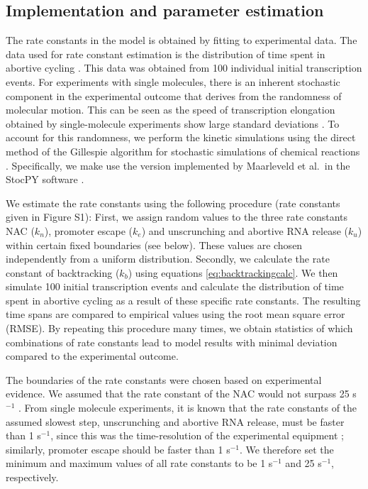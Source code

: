 \subsection{Implementation and parameter estimation}
The rate constants in the model is obtained by fitting to experimental data.
The data used for rate constant estimation is the distribution of time spent
in abortive cycling \cite{revyakin_abortive_2006}. This data was obtained from
100 individual initial transcription events. For experiments with single
molecules, there is an inherent stochastic component in the experimental
outcome that derives from the randomness of molecular motion. This can be seen
as the speed of transcription elongation obtained by single-molecule
experiments show large standard deviations \cite{adelman_single_2002,
tolic-norrelykke_diversity_2004}. To account for this randomness, we perform
the kinetic simulations using the direct method of the Gillespie algorithm for
stochastic simulations of chemical reactions \cite{gillespie_exact_1977}.
Specifically, we make use the version implemented by Maarleveld et al.\ in the
StocPY software \cite{maarleveld_stochpy:_2013}.

We estimate the rate constants using the following procedure (rate constants
given in Figure S1): First, we assign random values to the three rate
constants NAC ($k_n$), promoter escape ($k_e$) and unscrunching and abortive
RNA release ($k_u$) within certain fixed boundaries (see below). These values
are chosen independently from a uniform distribution. Secondly, we calculate
the rate constant of backtracking ($k_b$) using equations
\ref{eq:backtrackingcalc}. We then simulate 100 initial transcription events
and calculate the distribution of time spent in abortive cycling as a result
of these specific rate constants. The resulting time spans are compared to
empirical values \cite{revyakin_abortive_2006} using the root mean square
error (RMSE). By repeating this procedure many times, we obtain statistics of
which combinations of rate constants lead to model results with minimal
deviation compared to the experimental outcome.

The boundaries of the rate constants were chosen based on experimental
evidence. We assumed that the rate constant of the NAC would not surpass 25
s$^{-1}$ \cite{??}. From single molecule experiments, it is known that the
rate constants of the assumed slowest step, unscrunching and abortive RNA
release, must be faster than 1 s$^{-1}$, since this was the time-resolution of
the experimental equipment \cite{revyakin_abortive_2006}; similarly, promoter
escape should be faster than 1 s$^{-1}$. We therefore set the minimum and
maximum values of all rate constants to be 1 s$^{-1}$ and 25 s$^{-1}$,
respectively. 

